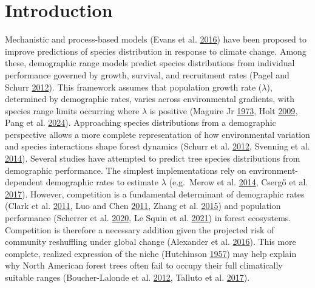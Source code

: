 \documentclass[12pt]{article}
\begin{document}
\hypertarget{introduction}{%
\section{Introduction}\label{introduction}}

Mechanistic and process-based models (Evans et al.
\protect\hyperlink{ref-Evans2016}{2016}) have been proposed to improve
predictions of species distribution in response to climate change. Among
these, demographic range models predict species distributions from
individual performance governed by growth, survival, and recruitment
rates (Pagel and Schurr \protect\hyperlink{ref-Pagel2012}{2012}). This
framework assumes that population growth rate (\(\lambda\)), determined
by demographic rates, varies across environmental gradients, with
species range limits occurring where \(\lambda\) is positive (Maguire Jr
\protect\hyperlink{ref-maguire1973niche}{1973}, Holt
\protect\hyperlink{ref-Holt2009}{2009}, Pang et al.
\protect\hyperlink{ref-pang2024niche}{2024}). Approaching species
distributions from a demographic perspective allows a more complete
representation of how environmental variation and species interactions
shape forest dynamics (Schurr et al.
\protect\hyperlink{ref-Schurr2012}{2012}, Svenning et al.
\protect\hyperlink{ref-Svenning2014}{2014}). Several studies have
attempted to predict tree species distributions from demographic
performance. The simplest implementations rely on environment-dependent
demographic rates to estimate \(\lambda\) (e.g.~Merow et al.
\protect\hyperlink{ref-Merow2014}{2014}, Csergő et al.
\protect\hyperlink{ref-Csergo2017}{2017}). However, competition is a
fundamental determinant of demographic rates (Clark et al.
\protect\hyperlink{ref-Clark2011}{2011}, Luo and Chen
\protect\hyperlink{ref-Luo2011}{2011}, Zhang et al.
\protect\hyperlink{ref-Zhang2015}{2015}) and population performance
(Scherrer et al. \protect\hyperlink{ref-Scherrer2020}{2020}, Le Squin et
al. \protect\hyperlink{ref-LeSquin2021}{2021}) in forest ecosystems.
Competition is therefore a necessary addition given the projected risk
of community reshuffling under global change (Alexander et al.
\protect\hyperlink{ref-Alexander2016}{2016}). This more complete,
realized expression of the niche (Hutchinson
\protect\hyperlink{ref-Hutchinson1957}{1957}) may help explain why North
American forest trees often fail to occupy their full climatically
suitable ranges (Boucher-Lalonde et al.
\protect\hyperlink{ref-BoucherLalonde2012}{2012}, Talluto et al.
\protect\hyperlink{ref-Talluto2017}{2017}).
\end{document}
